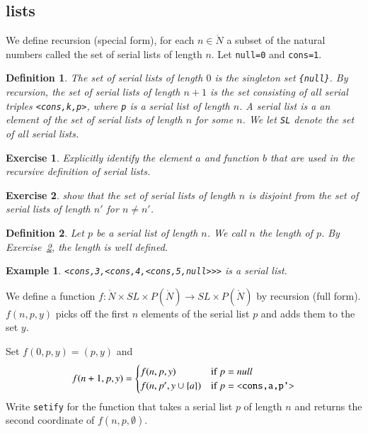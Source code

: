 \documentclass[cup9a]{cupbook}
\newtheorem{definition}{Definition}[chapter]
\newtheorem{example}{Example}[chapter]
\newtheorem{exer}{Exercise}[chapter]
\begin{document}
\subsection{lists}

We define recursion (special form), for each $n\in\ring{N}$ a subset of the natural numbers called the set of serial lists of length $n$.
  Let \verb!null=0! and
\verb!cons=1!.

\begin{definition}
The set of serial lists of length $0$ is the singleton set \verb!{null}!.  By recursion, the set of serial lists of length $n+1$ is the set
consisting of all serial triples \verb!<cons,k,p>!, where \verb!p! is a serial list of length $n$.   A serial list is a an element of the set of serial lists of length $n$ for some $n$.  We let \verb!SL! denote the set of all serial lists.
\end{definition}

\begin{exer} Explicitly identify the element $a$ and function $b$ that are used in the recursive definition of serial lists.
\end{exer}

\begin{exer}\label{exer:list-length} show that the set of serial lists of length $n$ is disjoint from the set of serial lists of length $n'$ for $n\ne n'$.
\end{exer}

\begin{definition} Let $p$ be a serial list of length $n$.  We call $n$ the length of $p$.  By Exercise~\ref{exer:list-length}, the length is well defined.
\end{definition}


\begin{example}
\verb!<cons,3,<cons,4,<cons,5,null>>>!
is a serial list.
\end{example}

We define a function $f:\ring{N}\times SL\times P(\ring{N})\to SL\times P(\ring{N})$ by recursion (full form).  $f(n,p,y)$ picks off the first $n$ elements of the serial list $p$ and adds them to the set $y$.

Set $f(0,p,y) = (p,y)$ and
$$
f(n+1,p,y) = \begin{cases} f(n,p,y) & \hbox{if } p = null\\
                f(n,p',y\cup\{a\}) & \hbox{if } p = \verb!<cons,a,p'>!\\
\end{cases}
$$
Write \verb!setify! for the function that takes a serial list $p$
of length $n$ and returns the second coordinate of $f(n,p,\emptyset)$.
\end{document}
